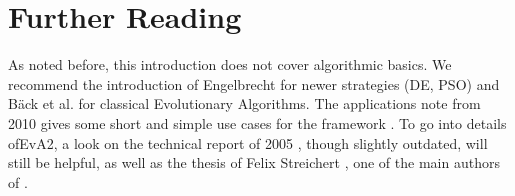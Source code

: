 \chapter{Further Reading\label{sec:Further-Reading}}

As noted before, this introduction does not cover algorithmic basics.
We recommend the introduction of Engelbrecht \cite{Engelbrecht07CI}
for newer strategies (DE, PSO) and Bäck et al. \cite{Baeck99EC1}
for classical Evolutionary Algorithms. The applications note from
2010 gives some short and simple use cases for the framework \cite{Kron10EvA2}.
To go into details of\noun{ }EvA2, a look on the technical report
of 2005 \cite{JOptDocumentation}, though slightly outdated, will
still be helpful, as well as the thesis of Felix Streichert \cite{Streichert07},
one of the main authors of .